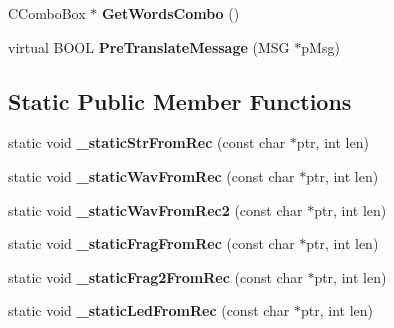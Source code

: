 \begin{DoxyCompactItemize}
\item 
\hypertarget{class_c_wavfrag_dlg_a449aead56afc49f1e86cd2aaac2cf30c}{C\-Combo\-Box $\ast$ {\bfseries Get\-Words\-Combo} ()}\label{class_c_wavfrag_dlg_a449aead56afc49f1e86cd2aaac2cf30c}

\item 
\hypertarget{class_c_wavfrag_dlg_a3e13332af937e317c3225358b04f722c}{virtual B\-O\-O\-L {\bfseries Pre\-Translate\-Message} (M\-S\-G $\ast$p\-Msg)}\label{class_c_wavfrag_dlg_a3e13332af937e317c3225358b04f722c}

\end{DoxyCompactItemize}
\subsection*{Static Public Member Functions}
\begin{DoxyCompactItemize}
\item 
\hypertarget{class_c_wavfrag_dlg_aa23c375fdf4e8c07278a013b45e96572}{static void {\bfseries \-\_\-static\-Str\-From\-Rec} (const char $\ast$ptr, int len)}\label{class_c_wavfrag_dlg_aa23c375fdf4e8c07278a013b45e96572}

\item 
\hypertarget{class_c_wavfrag_dlg_a21e0d41a3ead177e36091680f4f2b4b9}{static void {\bfseries \-\_\-static\-Wav\-From\-Rec} (const char $\ast$ptr, int len)}\label{class_c_wavfrag_dlg_a21e0d41a3ead177e36091680f4f2b4b9}

\item 
\hypertarget{class_c_wavfrag_dlg_ae791a82a5cdabcee7553871d4a862a24}{static void {\bfseries \-\_\-static\-Wav\-From\-Rec2} (const char $\ast$ptr, int len)}\label{class_c_wavfrag_dlg_ae791a82a5cdabcee7553871d4a862a24}

\item 
\hypertarget{class_c_wavfrag_dlg_a75631f3c4ac5e328dcbae57fb15a5b44}{static void {\bfseries \-\_\-static\-Frag\-From\-Rec} (const char $\ast$ptr, int len)}\label{class_c_wavfrag_dlg_a75631f3c4ac5e328dcbae57fb15a5b44}

\item 
\hypertarget{class_c_wavfrag_dlg_a9a8c24886baf6fad61b055184b25a01b}{static void {\bfseries \-\_\-static\-Frag2\-From\-Rec} (const char $\ast$ptr, int len)}\label{class_c_wavfrag_dlg_a9a8c24886baf6fad61b055184b25a01b}

\item 
\hypertarget{class_c_wavfrag_dlg_ae4094c2670f40174b826356db876d031}{static void {\bfseries \-\_\-static\-Led\-From\-Rec} (const char $\ast$ptr, int len)}\label{class_c_wavfrag_dlg_ae4094c2670f40174b826356db876d031}


\end{DoxyCompactItemize}
